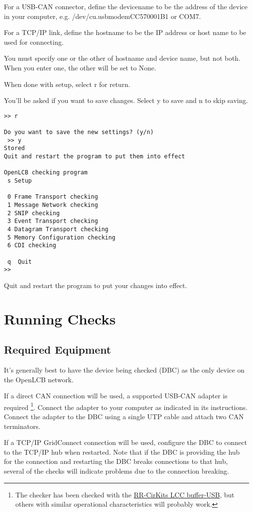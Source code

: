 For a USB-CAN connector, define the devicename to be the address of the device in your computer, 
e.g. /dev/cu.usbmodemCC570001B1 or COM7.

For a TCP/IP link, define the hostname to be the IP address or host name to be used 
for connecting.

You must specify one or the other of hostname and device name, but not both.
When you enter one, the other will be set to None.

When done with setup, select r for return.  

You'll be asked if you want to save changes.  
Select y to save and n to skip saving.

\begin{verbatim}
>> r

Do you want to save the new settings? (y/n)
 >> y
Stored
Quit and restart the program to put them into effect

OpenLCB checking program
 s Setup

 0 Frame Transport checking
 1 Message Network checking
 2 SNIP checking
 3 Event Transport checking
 4 Datagram Transport checking
 5 Memory Configuration checking
 6 CDI checking
  
 q  Quit
>> 
\end{verbatim}

Quit and restart the program to put your changes into effect.

\section{Running Checks}

\subsection{Required Equipment}

It's generally best to have the device being checked (DBC) 
as the only device on the OpenLCB network. 

If a direct CAN connection will be used,
a supported USB-CAN adapter is required
\footnote{The checker has been checked with the
\href{https://www.rr-cirkits.com/description/LCC-usb-flyer.pdf}{RR-CirKits LCC buffer-USB},
but others with similar operational characteristics will probably work.
}. 
Connect the adapter to your computer as indicated in its instructions.
Connect the adapter to the DBC using a single UTP cable
and attach two CAN terminators.

If a TCP/IP GridConnect connection will be used, 
configure the DBC to connect to the TCP/IP hub when restarted. Note that if 
the DBC is providing the hub for the connection and restarting the DBC
breaks connections to that hub, several of the checks will indicate problems
due to the connection breaking.

